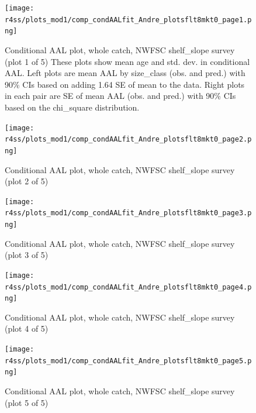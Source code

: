 \documentclass[12pt,]{article}
\begin{document}
\begin{figure}
\centering
\texttt{[image: r4ss/plots\_mod1/comp\_condAALfit\_Andre\_plotsflt8mkt0\_page1.png]}
\caption{Conditional AAL plot, whole catch, NWFSC shelf\_slope survey
(plot 1 of 5) These plots show mean age and std. dev. in conditional
AAL. Left plots are mean AAL by size\_class (obs. and pred.) with 90\%
CIs based on adding 1.64 SE of mean to the data. Right plots in each
pair are SE of mean AAL (obs. and pred.) with 90\% CIs based on the
chi\_square distribution. \label{fig:nwfsc_combo_andre_1}}
\end{figure}

\begin{figure}
\centering
\texttt{[image: r4ss/plots\_mod1/comp\_condAALfit\_Andre\_plotsflt8mkt0\_page2.png]}
\caption{Conditional AAL plot, whole catch, NWFSC shelf\_slope survey
(plot 2 of 5) \label{fig:nwfsc_combo_andre_2}}
\end{figure}

\begin{figure}
\centering
\texttt{[image: r4ss/plots\_mod1/comp\_condAALfit\_Andre\_plotsflt8mkt0\_page3.png]}
\caption{Conditional AAL plot, whole catch, NWFSC shelf\_slope survey
(plot 3 of 5) \label{fig:nwfsc_combo_andre_3}}
\end{figure}

\begin{figure}
\centering
\texttt{[image: r4ss/plots\_mod1/comp\_condAALfit\_Andre\_plotsflt8mkt0\_page4.png]}
\caption{Conditional AAL plot, whole catch, NWFSC shelf\_slope survey
(plot 4 of 5) \label{fig:nwfsc_combo_andre_4}}
\end{figure}

\begin{figure}
\centering
\texttt{[image: r4ss/plots\_mod1/comp\_condAALfit\_Andre\_plotsflt8mkt0\_page5.png]}
\caption{Conditional AAL plot, whole catch, NWFSC shelf\_slope survey
(plot 5 of 5) \label{fig:nwfsc_combo_andre_5}}
\end{figure}
\end{document}
